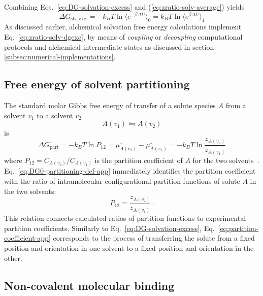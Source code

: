 \documentclass[9pt,bestpractices]{livecoms}
\begin{document}
Combining Eqs.~\ref{eq:DG-solvation-excess} and (\ref{eq:zratio-solv-average}) yields~\cite{widom1982potential} 
\begin{equation}
  \Delta G_{\mathrm{slv, exc.}} = - k_B T \ln \langle e^{-\beta \Delta U} \rangle_0 = k_B T \ln \langle e^{\beta \Delta U} \rangle_1
  \label{eq:zratio-solv-dgexc}
\end{equation}
As discussed earlier, alchemical solvation free energy calculations implement Eq.~\ref{eq:zratio-solv-dgexc}, by means of \emph{coupling} or \emph{decoupling} computational protocols and alchemical intermediate states as discussed in section \ref{subsec:numerical-implementations}.

\subsection{Free energy of solvent partitioning}\label{sec:derivations-partitioning}

The standard molar Gibbs free energy of transfer of a solute species $A$ from a  solvent $v_1$ to a solvent $v_2$
\begin{equation}
A(v_1)  \leftrightharpoons A(v_2)
\end{equation}
is
\begin{equation}
  \Delta G^\circ_{\mathrm{part}} = -k_B T \ln P_{12} = \mu^\circ_{A(v_2)}  - \mu^\circ_{A(v_1)} = -k_B T \ln \frac{z_{A(v_2)}}{z_{A(v_1)}}
  \label{eq:DG0-partitioning-def-app}
\end{equation}
where $P_{12} = C_{A(v_2)}/C_{A(v_1)}$ is the partition coefficient of $A$ for the two solvents~\cite{rustenburg2016measuring}. Eq.~\ref{eq:DG0-partitioning-def-app} 
immediately identifies the partition coefficient with the ratio of intramolecular configurational partition functions of solute $A$ in the two solvents:
\begin{equation}
  P_{12} = \frac{z_{A(v_2)}}{z_{A(v_1)}} \, .
  \label{eq:partition-coefficient-app}
\end{equation}
This relation connects calculated ratios of partition functions to experimental partition coefficients. Similarly to Eq.~\ref{eq:DG-solvation-excess}, Eq.~\ref{eq:partition-coefficient-app} corresponds to the process of transferring the solute from a fixed position and orientation in one solvent to a fixed position and orientation in the other.

\subsection{Non-covalent molecular binding}
\label{sec:non-covalent-molecular-binding-app}
\end{document}
